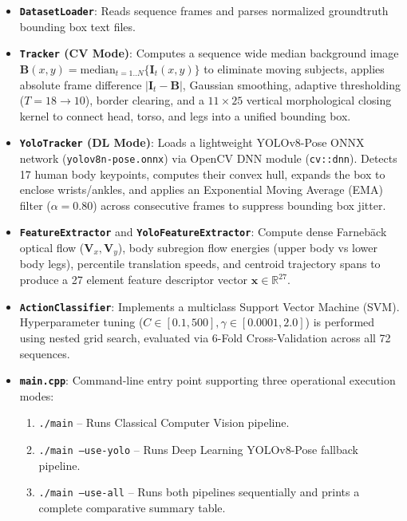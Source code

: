 \documentclass[11pt,a4paper]{article}
\begin{document}
\begin{itemize}
    \item \textbf{\texttt{DatasetLoader}}: Reads sequence frames and parses normalized groundtruth bounding box text files.
    \item \textbf{\texttt{Tracker} (CV Mode)}: Computes a sequence wide median background image $\mathbf{B}(x,y) = \text{median}_{t=1..N} \{\mathbf{I}_t(x,y)\}$ to eliminate moving subjects, applies absolute frame difference $|\mathbf{I}_t - \mathbf{B}|$, Gaussian smoothing, adaptive thresholding ($T=18 \to 10$), border clearing, and a $11 \times 25$ vertical morphological closing kernel to connect head, torso, and legs into a unified bounding box.
    \item \textbf{\texttt{YoloTracker} (DL Mode)}: Loads a lightweight YOLOv8-Pose ONNX network (\texttt{yolov8n-pose.onnx}) via OpenCV DNN module (\texttt{cv::dnn}). Detects 17 human body keypoints, computes their convex hull, expands the box to enclose wrists/ankles, and applies an Exponential Moving Average (EMA) filter ($\alpha=0.80$) across consecutive frames to suppress bounding box jitter.
    \item \textbf{\texttt{FeatureExtractor}} and \textbf{\texttt{YoloFeatureExtractor}}: Compute dense Farneb\"ack optical flow ($\mathbf{V}_x, \mathbf{V}_y$), body subregion flow energies (upper body vs lower body legs), percentile translation speeds, and centroid trajectory spans to produce a 27 element feature descriptor vector $\mathbf{x} \in \mathbb{R}^{27}$.
    \item \textbf{\texttt{ActionClassifier}}: Implements a multiclass Support Vector Machine (SVM).
    Hyperparameter tuning ($C \in [0.1, 500], \gamma \in [0.0001, 2.0]$) is performed using nested grid search, evaluated via 6-Fold Cross-Validation across all 72 sequences.
    \item \textbf{\texttt{main.cpp}}: Command-line entry point supporting three operational execution modes:
    \begin{enumerate}
        \item \texttt{./main} -- Runs Classical Computer Vision pipeline.
        \item \texttt{./main --use-yolo} -- Runs Deep Learning YOLOv8-Pose fallback pipeline.
        \item \texttt{./main --use-all} -- Runs both pipelines sequentially and prints a complete comparative summary table.
    \end{enumerate}
\end{itemize}
\end{document}
